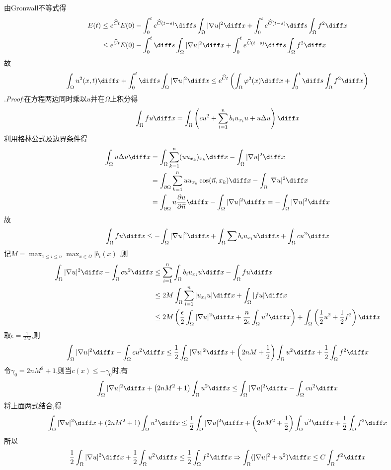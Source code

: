 由Gronwall不等式得
\[\begin{split}
E(t)&\leq e^{\widehat{C}t}E(0)-\int_0^te^{\widehat{C}(t-s)}\diff s\int_{\Omega}|\nabla u|^2\diff x+\int_0^te^{\widehat{C}(t-s)}\diff s\int_{\Omega}f^2\diff x\\
&\leq e^{\widehat{C}t}E(0)-\int_0^t\diff s\int_{\Omega}|\nabla u|^2\diff x+\int_0^te^{\widehat{C}(t-s)}\diff s\int_{\Omega}f^2\diff x
\end{split}\]
故
\[\int_{\Omega}u^2(x,t)\diff x+\int_0^t\diff s\int_{\Omega}|\nabla u|^2\diff x\leq e^{\widehat{C}t}\left(\int_{\Omega}\varphi^2(x)\diff x+\int_0^t\diff s\int_{\Omega}f^2\diff x\right)\]
.\textit{Proof}:在方程两边同时乘以$u$并在$\Omega$上积分得
\[\int_{\Omega}fu\diff x=\int_{\Omega}\left(cu^2+\sum_{i=1}^nb_iu_{x_i}u+u\Delta u\right)\diff x\]
利用格林公式及边界条件得
\[\begin{split}
\int_{\Omega}u\Delta u\diff x
&=\int_{\Omega}\sum_{k=1}^n(uu_{x_k})_{x_k}\diff x-\int_{\Omega}|\nabla u|^2\diff x\\
&=\int_{\partial\Omega}\sum_{k=1}^nuu_{x_k}\cos(\vec{n},x_k)\diff x-\int_{\Omega}|\nabla u|^2\diff x\\
&=\int_{\partial\Omega}u\frac{\partial u}{\partial\vec{n}}\diff x-\int_{\Omega}|\nabla u|^2\diff x=-\int_{\Omega}|\nabla u|^2\diff x
\end{split}\]
故
\[\int_{\Omega}fu\diff x\leq-\int_{\Omega}|\nabla u|^2\diff x+\int_{\Omega}\sum b_iu_{x_i}u\diff x+\int_{\Omega}cu^2\diff x\]
记$M=\max_{1\leq i\leq n}\max_{x\in\Omega}|b_i(x)|$,则
\[\begin{split}
\int_{\Omega}|\nabla u|^2\diff x-\int_{\Omega}cu^2\diff x
&\leq\sum_{i=1}^n\int_{\Omega}b_iu_{x_i}u\diff x-\int_{\Omega}fu\diff x\\
&\leq2M\int_{\Omega}\sum_{i=1}^n|u_{x_i}u|\diff x+\int_{\Omega}|fu|\diff x\\
&\leq2M\left(\frac{\epsilon}{2}\int_{\Omega}|\nabla u|^2\diff x+\frac{n}{2\epsilon}\int_{\Omega}u^2\diff x\right)+\int_{\Omega}\left(\frac{1}{2}u^2+\frac{1}{2}f^2\right)\diff x
\end{split}\]
取$\epsilon=\frac{1}{2M}$,则
\[\int_{\Omega}|\nabla u|^2\diff x-\int_{\Omega}cu^2\diff x\leq\frac{1}{2}\int_{\Omega}|\nabla u|^2\diff x+\left(2nM+\frac{1}{2}\right)\int_{\Omega}u^2\diff x+\frac{1}{2}\int_{\Omega}f^2\diff x\]
令$\gamma_0=2nM^2+1$,则当$c(x)\leq-\gamma_0$时,有
\[\int_{\Omega}|\nabla u|^2\diff x+\left(2nM^2+1\right)\int_{\Omega}u^2\diff x\leq\int_{\Omega}|\nabla u|^2\diff x-\int_{\Omega}cu^2\diff x\]
将上面两式结合,得
\[\int_{\Omega}|\nabla u|^2\diff x+(2nM^2+1)\int_{\Omega}u^2\diff x\leq\frac{1}{2}\int_{\Omega}|\nabla u|^2\diff x+\left(2nM^2+\frac{1}{2}\right)\int_{\Omega}u^2\diff x+\frac{1}{2}\int_{\Omega}f^2\diff x\]
所以
\[\frac{1}{2}\int_{\Omega}|\nabla u|^2\diff x+\frac{1}{2}\int_{\Omega}u^2\diff x\leq\frac{1}{2}\int_{\Omega}f^2\diff x\Rightarrow\int_{\Omega}(|\nabla u|^2+u^2)\diff x\leq C\int_{\Omega}f^2\diff x\]